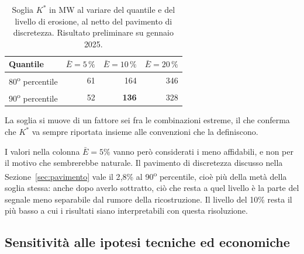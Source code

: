 \begin{table}[H]
\centering
\caption{Soglia $K^*$ in MW al variare del quantile e del livello di erosione, al netto del
         pavimento di discretezza. Risultato preliminare su gennaio 2025.}
\label{tab:sensitivita-soglia}
\begin{tabular}{@{}lrrr@{}}
\toprule
\textbf{Quantile} & $\bar{E} = 5\,\%$ & $\bar{E} = 10\,\%$ & $\bar{E} = 20\,\%$ \\
\midrule
80\textsuperscript{o} percentile & 61 & 164 & 346 \\
90\textsuperscript{o} percentile & 52 & \textbf{136} & 328 \\
\bottomrule
\end{tabular}
\end{table}

La soglia si muove di un fattore sei fra le combinazioni estreme, il che conferma che $K^*$ va
sempre riportata insieme alle convenzioni che la definiscono.

I valori nella colonna $\bar{E} = 5\%$ vanno per\`o considerati i meno affidabili, e non per
il motivo che sembrerebbe naturale. Il pavimento di discretezza discusso nella
Sezione~\ref{sec:pavimento} vale il 2{,}8\% al 90\textsuperscript{o} percentile, cio\`e pi\`u
della met\`a della soglia stessa: anche dopo averlo sottratto, ci\`o che resta a quel livello
\`e la parte del segnale meno separabile dal rumore della ricostruzione. Il livello del 10\%
resta il pi\`u basso a cui i risultati siano interpretabili con questa risoluzione.

\subsection{Sensitivit\`a alle ipotesi tecniche ed economiche}

